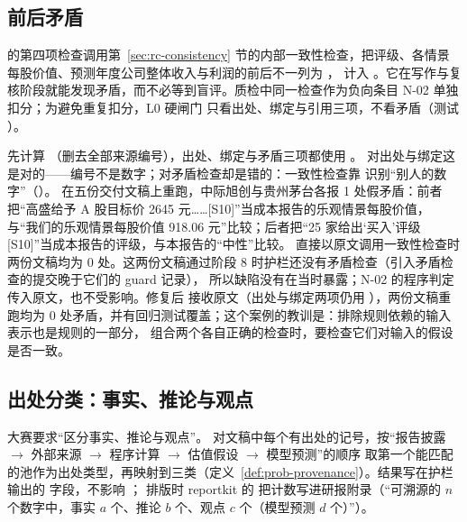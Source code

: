 \subsection{前后矛盾}
\label{sec:guards-contra}

 的第四项检查调用第~\ref{sec:rc-consistency} 节的内部一致性检查，把评级、各情景每股价值、预测年度公司整体收入与利润的前后不一列为 ，
计入 。它在写作与复核阶段就能发现矛盾，而不必等到盲评。质检中同一检查作为负向条目 N-02 单独扣分；为避免重复扣分，L0 硬闸门 
只看出处、绑定与引用三项，不看矛盾（测试 ）。

\begin{failcase}
 先计算 （删去全部来源编号），出处、绑定与矛盾三项都使用 。
对出处与绑定这是对的——编号不是数字；对矛盾检查却是错的：一致性检查靠 \code{[S编号]} 识别“别人的数字”（）。
在五份交付文稿上重跑，中际旭创与贵州茅台各报 1 处假矛盾：前者把“高盛给予 A 股目标价 2645 元……[S10]”当成本报告的乐观情景每股价值，
与“我们的乐观情景每股价值 918.06 元”比较；后者把“25 家给出‘买入’评级 [S10]”当成本报告的评级，与本报告的“中性”比较。
直接以原文调用一致性检查时两份文稿均为 0 处。这两份文稿通过阶段 8 时护栏还没有矛盾检查（引入矛盾检查的提交晚于它们的 guard 记录），
所以缺陷没有在当时暴露；N-02 的程序判定传入原文，也不受影响。修复后  接收原文（出处与绑定两项仍用 ），两份文稿重跑均为 0 处矛盾，并有回归测试覆盖；这个案例的教训是：排除规则依赖的输入表示也是规则的一部分，
组合两个各自正确的检查时，要检查它们对输入的假设是否一致。
\end{failcase}

\subsection{出处分类：事实、推论与观点}
\label{sec:guards-class}

大赛要求“区分事实、推论与观点”。 对文稿中每个有出处的记号，按“报告披露 $\to$ 外部来源 $\to$ 程序计算 $\to$ 估值假设 $\to$ 模型预测”的顺序
取第一个能匹配的池作为出处类型，再映射到三类（定义~\ref{def:prob-provenance}）。结果写在护栏输出的  字段，不影响 ；
排版时 reportkit 的  把计数写进研报附录（“可溯源的 $n$ 个数字中，事实 $a$ 个、推论 $b$ 个、观点 $c$ 个（模型预测 $d$ 个）”）。

